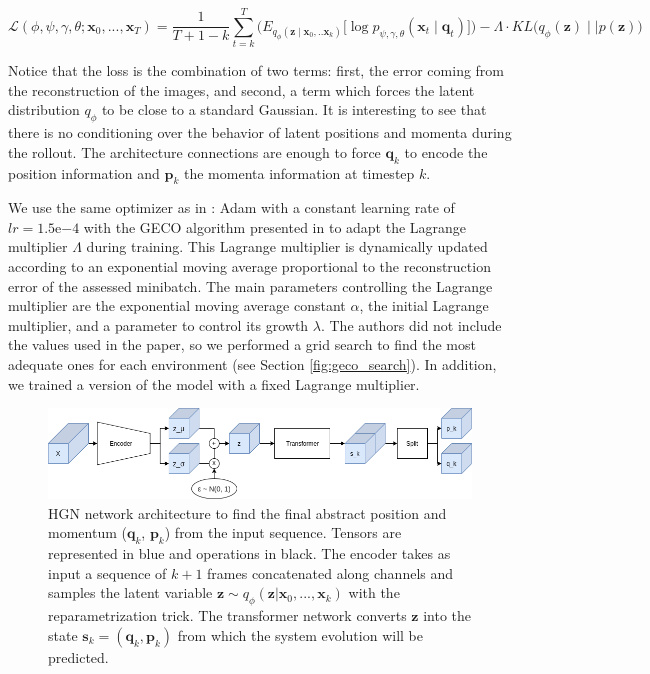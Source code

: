 \begin{equation}
    \mathcal{L} (\phi, \psi, \gamma, \theta; \bm{x}_0, ..., \bm{x}_T) = \frac{1}{T + 1 - k}
    \sum_{t=k}^T
    \Big(
    E_{q_\phi (\bm{z} \mid \bm{x}_0, .. \bm{x}_k)}
    \big[
    \log p_{\psi, \gamma, \theta} (\bm{x}_t \mid \bm{q}_t)
    \big]
    \Big)
    - \Lambda \cdot KL \big(q_\phi(\bm{z}) \mid \mid p(\bm{z})\big)
\label{eq:loss}
\end{equation}

Notice that the loss is the combination of two terms:
first, the error coming from the reconstruction of the images, and second, a term which forces the latent distribution $q_{\phi}$ to be close to a standard Gaussian.
It is interesting to see that there is no conditioning over the behavior of latent positions and momenta during the rollout.
The architecture connections are enough to force $\bm{q}_k$ to encode the position information and $\bm{p}_k$ the momenta information at timestep $k$. 

We use the same optimizer as in \cite{hgn}:
Adam \cite{adam} with a constant learning rate of $lr=1.5\mathrm{e}{-4}$ with the GECO algorithm presented in \cite{geco} to adapt the Lagrange multiplier $\Lambda$ during training.
This Lagrange multiplier is dynamically updated according to an exponential moving average proportional to the reconstruction error of the assessed minibatch.
The main parameters controlling the Lagrange multiplier are the exponential moving average constant $\alpha$, the initial Lagrange multiplier, and a parameter to control its growth $\lambda$.
The authors did not include the values used in the paper, so we performed a grid search to find the most adequate ones for each environment (see Section \ref{fig:geco_search}).
In addition, we trained a version of the model with a fixed Lagrange multiplier.

\begin{figure}[h]
\centering
\includegraphics[width=\textwidth]{../openreview/pictures/HGN_Architecture.png}
\caption{HGN network architecture to find the final abstract position and momentum ($\bm{q}_k$, $\bm{p}_k$) from the input sequence. Tensors are represented in blue and operations in black. The encoder takes as input a sequence of $k+1$ frames concatenated along channels and samples the latent variable $\bm{z} \sim q_{\phi}(\bm{z} \vert \bm{x}_0, ..., \bm{x}_k)$ with the reparametrization trick. The transformer network converts $\bm{z}$ into the state $\bm{s}_k = (\bm{q}_k, \bm{p}_k)$ from which the system evolution will be predicted.}
\label{fig:initial_cond}
\end{figure}

